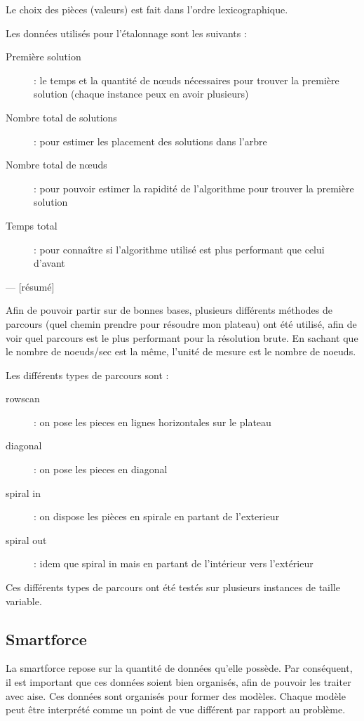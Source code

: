 	Le choix des pièces (valeurs) est fait dans l'ordre lexicographique.
	
	Les données utilisés pour l'étalonnage sont les suivants :
	
	\begin{description}
		\item[Première solution] : le temps et la quantité de n\oe uds nécessaires pour trouver la première solution (chaque instance peux en avoir plusieurs)
		\item[Nombre total de solutions] : pour estimer les placement des solutions dans l'arbre
		\item[Nombre total de n\oe uds] : pour pouvoir estimer la rapidité de l'algorithme pour trouver la première solution
		\item[Temps total] : pour connaître si l'algorithme utilisé est plus performant que celui d'avant
	\end{description}
	
	--- [résumé]
	
	Afin de pouvoir partir sur de bonnes bases, plusieurs différents méthodes de parcours (quel chemin prendre pour résoudre mon plateau) ont été utilisé, afin de voir quel parcours est le plus performant pour la résolution brute. En sachant que le nombre de noeuds/sec est la même, l'unité de mesure est le nombre de noeuds.

	Les différents types de parcours sont :

	\begin{description}
		\item[rowscan]: on pose les pieces en lignes horizontales sur le plateau
		\item[diagonal]: on pose les pieces en diagonal
		\item[spiral in]: on dispose les pièces en spirale en partant de l'exterieur
		\item[spiral out]: idem que spiral in mais en partant de l'intérieur vers l'extérieur
	\end{description}

	Ces différents types de parcours ont été testés sur plusieurs instances de taille variable.

	\subsection{Smartforce}

	La smartforce repose sur la quantité de données qu'elle possède. Par conséquent, il est important que ces données soient bien organisés, afin de pouvoir les traiter avec aise. Ces données sont organisés pour former des modèles. Chaque modèle peut être interprété comme un point de vue différent par rapport au problème.
	
